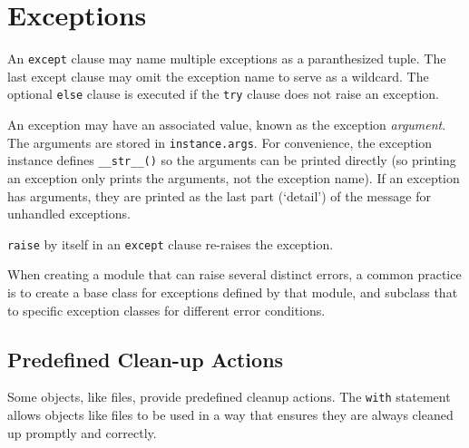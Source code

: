 \section{Exceptions}

An \verb=except= clause may name multiple exceptions as a paranthesized tuple.
The last except clause may omit the exception name to serve as a wildcard.
The optional \verb=else= clause is executed
if the \verb=try= clause does not raise an exception.

An exception may have an associated value,
known as the exception \emph{argument}.
The arguments are stored in \verb=instance.args=.
For convenience, the exception instance defines \verb=__str__()=
so the arguments can be printed directly
(so printing an exception only prints the arguments, not the exception name).
If an exception has arguments, they are printed as the last part (‘detail’)
of the message for unhandled exceptions.

\verb=raise= by itself in an \verb=except= clause re-raises the exception.

When creating a module that can raise several distinct errors,
a common practice is to create a base class
for exceptions defined by that module,
and subclass that to specific exception classes for different error conditions.

\subsection{Predefined Clean-up Actions}

Some objects, like files, provide predefined cleanup actions.
The \verb=with= statement allows objects like files to be used
in a way that ensures they are always cleaned up promptly and correctly.
